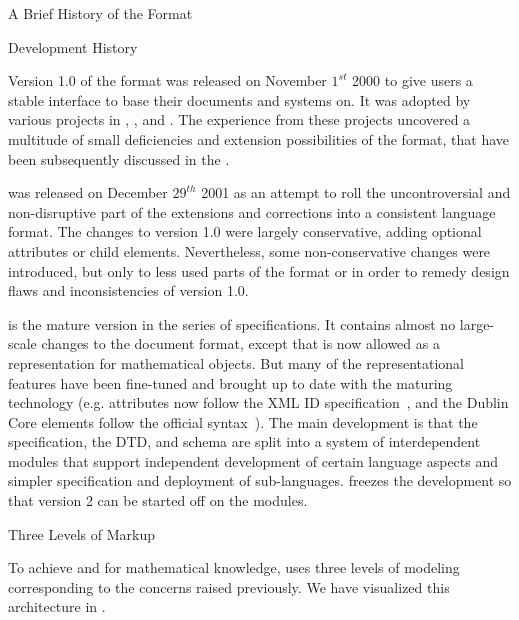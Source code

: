 \begin{omgroup}[id=omdoc-markup,short=Open Mathematical Documents]
\begin{omgroup}[id=omdoc-history]{A Brief History of the {\omdoc} Format}
  \begin{omgroup}{Development History} 

    Version 1.0 of the {\omdoc} format was released on November $1^{st}$ 2000 to give
    users a stable interface to base their documents and systems on. It was adopted by
    various projects in {},
    {}, and
    {}. The experience from these projects
    uncovered a multitude of small deficiencies and extension possibilities of the format,
    that have been subsequently discussed in the {\omdoc} {}.

    {} was released on December $29^{th}$ 2001 as an attempt to roll the
    uncontroversial and non-disruptive part of the extensions and corrections into a
    consistent language format. The changes to version 1.0 were largely conservative,
    adding optional attributes or child elements. Nevertheless, some non-conservative
    changes were introduced, but only to less used parts of the format or in order to
    remedy design flaws and inconsistencies of version 1.0.

    {} is the mature version in the {} series of specifications. It
    contains almost no large-scale changes to the document format, except that {\cmathml}
    is now allowed as a representation for mathematical objects. But many of the
    representational features have been fine-tuned and brought up to date with the
    maturing {\xml} technology (e.g.  attributes now
    follow the XML ID specification~\cite{XML:id05}, and the Dublin Core elements follow
    the official syntax~\cite{DCMI:dmt03}). The main development is that the {\omdoc}
    specification, the DTD, and schema are split into a system of interdependent modules
    that support independent development of certain language aspects and simpler
    specification and deployment of sub-languages.  {} freezes the development
    so that version 2 can be started off on the modules.  
  \end{omgroup}
\end{omgroup}

\begin{omgroup}[id=three-level-markup]{Three Levels of Markup}

  To achieve  and {} for
  mathematical knowledge, {\omdoc} uses three levels of modeling corresponding to the
  concerns raised previously. We have visualized this architecture in
  {}.


\end{omgroup}
\end{omgroup}
